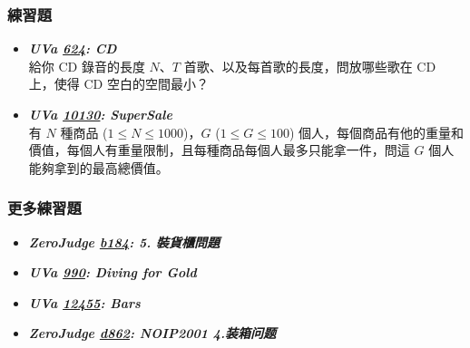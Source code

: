 \subsubsection*{練習題}
\begin{itemize}[label={\Checkmark}]
\item \textbf{\textit{UVa \href{http://uva.onlinejudge.org/external/6/624.html}{624}: CD}}\\
給你 CD 錄音的長度 $N$、$T$ 首歌、以及每首歌的長度，問放哪些歌在 CD 上，使得 CD 空白的空間最小？
\item \textbf{\textit{UVa \href{http://uva.onlinejudge.org/external/101/10130.html}{10130}: SuperSale}}\\
有 $N$ 種商品 ($1\leq{N}\leq{1000}$)，$G$ ($1\leq{G}\leq{100}$) 個人，每個商品有他的重量和價值，每個人有重量限制，且每種商品每個人最多只能拿一件，問這 $G$ 個人能夠拿到的最高總價值。
\end{itemize}
\subsubsection*{更多練習題}
\begin{itemize}[label={\PencilLeftDown}]
\item \textbf{\textit{ZeroJudge \href{http://zerojudge.tw/ShowProblem?problemid=b184}{b184}: 5. 裝貨櫃問題}}
\item \textbf{\textit{UVa \href{http://uva.onlinejudge.org/external/9/990.html}{990}: Diving for Gold}}
\item \textbf{\textit{UVa \href{http://uva.onlinejudge.org/external/124/12455.html}{12455}: Bars}}
\item \textbf{\textit{ZeroJudge \href{http://zerojudge.tw/ShowProblem?problemid=d862}{d862}: NOIP2001 4.装箱问题}}
\end{itemize}